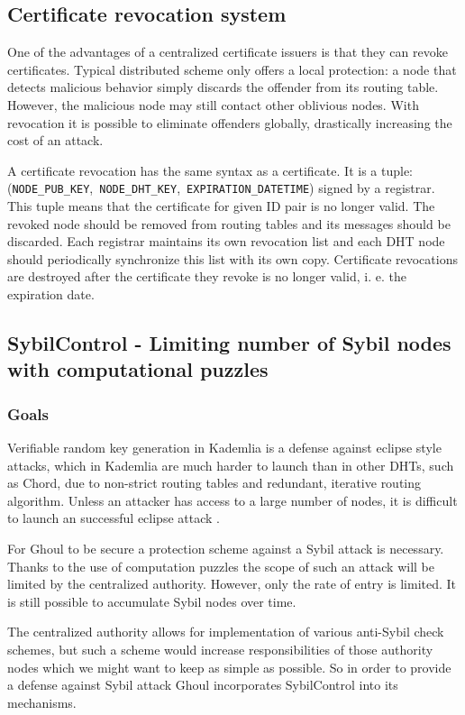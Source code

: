 \subsection{Certificate revocation system}

One of the advantages of a centralized certificate issuers is that they can
revoke certificates. Typical distributed scheme only offers a local protection:
a node that detects malicious behavior simply discards the offender from its
routing table. However, the malicious node may still contact other oblivious
nodes. With revocation it is possible to eliminate offenders globally,
drastically increasing the cost of an attack.

A certificate revocation has the same syntax as a certificate. It is a
tuple:\\
(\texttt{NODE\_PUB\_KEY},~\texttt{NODE\_DHT\_KEY},~\texttt{EXPIRATION\_DATETIME})
signed by a registrar. This tuple means that the certificate for given ID pair
is no longer valid. The revoked node should be removed from routing tables and
its messages should be discarded. Each registrar maintains its own revocation
list and each DHT node should periodically synchronize this list with its own
copy.
Certificate revocations are destroyed after the certificate they revoke is no
longer valid, i. e. the expiration date.

\subsection{SybilControl - Limiting number of Sybil nodes with computational
puzzles}
\subsubsection{Goals}
  Verifiable random key generation in Kademlia is a defense against eclipse
  style attacks, which in Kademlia are much harder to launch than in other
  DHTs, such as Chord, due to non-strict routing tables and redundant, iterative
  routing algorithm.
  Unless an attacker has access to a large number of nodes, it is difficult to
  launch an successful eclipse attack \cite{mac09}.

  For Ghoul to be secure a protection scheme against a Sybil attack is
  necessary.
  Thanks to the use of computation puzzles the scope of such an attack will be
  limited by the centralized authority.
  However, only the rate of entry is limited.
  It is still possible to accumulate Sybil nodes over time.

  The centralized authority allows for implementation of various anti-Sybil
  check schemes, but such a scheme would increase responsibilities of those
  authority nodes which we might want to keep as simple as possible.
  So in order to provide a defense against Sybil attack Ghoul incorporates
  SybilControl into its mechanisms.

